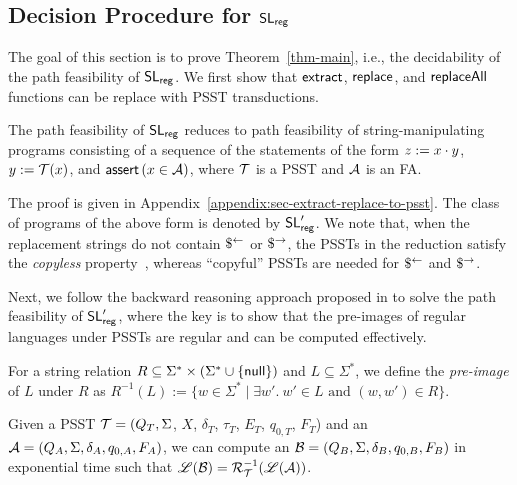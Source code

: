 
\subsection{Decision Procedure for $\mathsf{SL}_{\sf reg}$} \label{sec:decision}

The goal of this section is to prove Theorem~\ref{thm-main}, i.e., the decidability of the path feasibility of $\mathsf{SL}_{\sf reg}$.
We first show that $\mathsf{extract}$, $\mathsf{replace}$, and $\mathsf{replaceAll}$ functions can be replace with PSST transductions.

\begin{lemma}\label{lem-str-fun-to-psst}
    The path feasibility of $\mathsf{SL}_{\sf reg}$ reduces to path feasibility of string-manipulating programs consisting of a sequence of the statements of the form $z:=x \cdot y$, $y:=\mathcal{T}(x)$, and $\textsf{assert}\left(x \in \mathcal{A}\right)$, where $\mathcal{T}$ is a PSST and $\mathcal{A}$ is an FA.
\end{lemma}

The proof is given in Appendix~\ref{appendix:sec-extract-replace-to-psst}.
The class of programs of the above form is denoted by $\mathsf{SL}'_{\sf reg}$.
We note that, when the replacement strings do not contain $\$^{\leftarrow}$ or $\$^{\rightarrow}$, the PSSTs in the reduction satisfy the \emph{copyless} property~\cite{AC10}, whereas ``copyful'' PSSTs are needed for $\$^{\leftarrow}$ and $\$^{\rightarrow}$.

Next, we follow the backward reasoning approach proposed in \cite{CCH+18,CHL+19} to solve the path feasibility of $\mathsf{SL}'_{\sf reg}$, where the key is to show that the pre-images of regular languages  under PSSTs  are regular and can be computed effectively.

\begin{definition}
For a string relation $R \subseteq \Sigma^* \times (\Sigma^* \cup \{\mathsf{null}\})$ and $L \subseteq \Sigma^*$, we define the \emph{pre-image} of $L$ under $R$ as $R^{-1}(L):=\{w \in \Sigma^* \mid \exists w'.\ w' \in L \mbox{ and } (w, w') \in R\}$.
\end{definition}


 \begin{lemma}
  \label{lem:psst_preimage}
  Given a PSST $\mathcal{T} = (Q_T, \Sigma$, $X$, $\delta_T$, $\tau_T$, $E_T$,  $q_{0, T}$, $F_T$) and an \FA{} $\mathcal{A}
  = (Q_A, \Sigma, \delta_A, q_{0, A}, F_A)$, we can compute an \FA{} $\mathcal{B} = (Q_B,
  \Sigma, \delta_B, q_{0, B}, F_B)$ in exponential time  such that $\mathscr{L}(\mathcal{B}) = \mathcal{R}^{-1}_{\mathcal{T}}(\mathscr{L}(\mathcal{A}))$.
\end{lemma}


